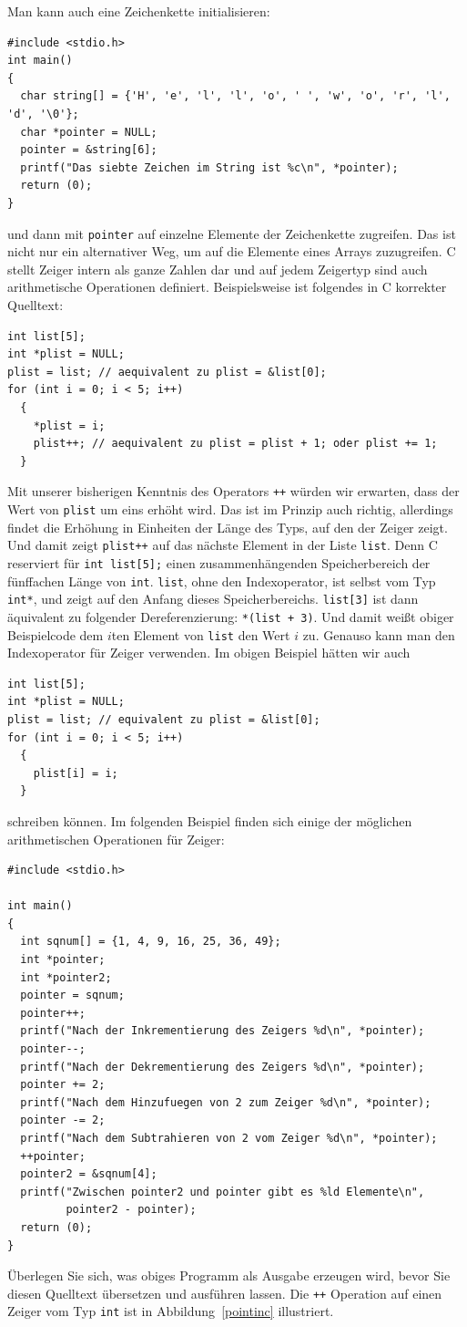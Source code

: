 Man kann auch eine Zeichenkette initialisieren:
\begin{lstlisting}
#include <stdio.h>
int main()
{
  char string[] = {'H', 'e', 'l', 'l', 'o', ' ', 'w', 'o', 'r', 'l', 'd', '\0'};
  char *pointer = NULL;
  pointer = &string[6];
  printf("Das siebte Zeichen im String ist %c\n", *pointer);
  return (0);
}
\end{lstlisting}
und dann mit \verb|pointer| auf einzelne Elemente der Zeichenkette zugreifen.
Das ist nicht nur ein alternativer Weg, um auf die Elemente eines Arrays zuzugreifen.
C stellt Zeiger intern als ganze Zahlen dar und auf jedem Zeigertyp sind auch arithmetische Operationen definiert.
Beispielsweise ist folgendes in C korrekter Quelltext:
\begin{lstlisting}
int list[5];
int *plist = NULL;
plist = list; // aequivalent zu plist = &list[0];
for (int i = 0; i < 5; i++)
  {
    *plist = i;
    plist++; // aequivalent zu plist = plist + 1; oder plist += 1;
  }
\end{lstlisting}
Mit unserer bisherigen Kenntnis des Operators \verb|++| würden wir erwarten, dass der Wert von \verb|plist| um eins erhöht wird.
Das ist im Prinzip auch richtig, allerdings findet die Erhöhung in Einheiten der Länge des Typs, auf den der Zeiger zeigt.
Und damit zeigt \verb|plist++| auf das nächste Element in der Liste \verb|list|.
Denn C reserviert für \verb|int list[5];| einen zusammenhängenden Speicherbereich der fünffachen Länge von \verb|int|.
\verb|list|, ohne den Indexoperator, ist selbst vom Typ \verb|int*|, und zeigt auf den Anfang dieses Speicherbereichs.
\verb|list[3]| ist dann äquivalent zu folgender Dereferenzierung: \verb|*(list + 3)|.
Und damit weißt obiger Beispielcode dem $i$ten Element von \verb|list| den Wert $i$ zu.
Genauso kann man den Indexoperator für Zeiger verwenden.
Im obigen Beispiel hätten wir auch
\begin{lstlisting}
int list[5];
int *plist = NULL;
plist = list; // equivalent zu plist = &list[0];
for (int i = 0; i < 5; i++)
  {
    plist[i] = i;
  }
\end{lstlisting}
schreiben können.
Im folgenden Beispiel finden sich einige der möglichen arithmetischen Operationen für Zeiger:
\begin{lstlisting}
#include <stdio.h>

int main()
{
  int sqnum[] = {1, 4, 9, 16, 25, 36, 49};
  int *pointer;
  int *pointer2;
  pointer = sqnum;
  pointer++;
  printf("Nach der Inkrementierung des Zeigers %d\n", *pointer);
  pointer--;
  printf("Nach der Dekrementierung des Zeigers %d\n", *pointer);
  pointer += 2;
  printf("Nach dem Hinzufuegen von 2 zum Zeiger %d\n", *pointer);
  pointer -= 2;
  printf("Nach dem Subtrahieren von 2 vom Zeiger %d\n", *pointer);
  ++pointer;
  pointer2 = &sqnum[4];
  printf("Zwischen pointer2 und pointer gibt es %ld Elemente\n",
         pointer2 - pointer);
  return (0);
}
\end{lstlisting}
Überlegen Sie sich, was obiges Programm als Ausgabe erzeugen wird, bevor Sie diesen Quelltext übersetzen und ausführen lassen.
Die \verb|++| Operation auf einen Zeiger vom Typ \verb|int| ist in Abbildung~\ref{pointinc} illustriert.


